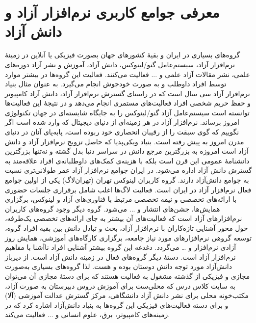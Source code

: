 \documentclass{article}
\begin{document}
\section{معرفی جوامع کاربری نرم‌افزار آزاد و دانش آزاد}
گروه‌های بسیاری در ایران و بقیهٔ کشورهای جهان بصورت فیزیکی یا آنلاین در زمینهٔ نرم‌افزار آزاد، سیستم‌عامل‌ گنو/لینوکس، دانش آزاد، آموزش و نشر آزاد دوره‌های علمی، نشر مقالات آزاد علمی و ... فعالیت می‌کنند. فعالیت این گروه‌ها در بیشتر موارد توسط افراد داوطلب و به صورت خودجوش انجام می‌گیرد.
به عنوان مثال بنیاد نرم‌افزار آزاد سی سال است که در راستای گسترش نرم‌افزار آزاد، دانش آزاد کامپیوتر و حفظ حریم شخصی افراد فعالیت‌های مستمری انجام می‌دهد و در نتیجهٔ این فعالیت‌ها توانسته است سیستم‌عامل آزاد گنو/لینوکس را به جایگاه شایسته‌ای در جهان تکنولوژی امروز برساند. نرم‌افزار آزاد در هر زمینه‌ای از دنیای دیجیتال که وارد شده است اگر نگوییم که گوی سبقت را از رقیبان انحصاری خود ربوده است، پابه‌پای آنان در دنیای مدرن امروز به پیش رفته است.
بنیاد ویکی‌پدیا که حاصل تزویج نرم‌افزار آزاد و دانش آزاد است امروزه به بزرگترین مرجع دانش در سراسر دنیا بدل گشته و نه‌تنها بزرگترین دانشنامهٔ عمومی این قرن است بلکه با هزینه‌ی کمک‌های داوطلبانه‌ی افراد علاقه‌مند به گسترش دانش آزاد اداره می‌شود.
در ایران جوامع نرم‌افزار آزاد عمر طولانی‌تری نسبت به جوامع دانش‌آزاد دارند. گروه کاربران لینوکس تهران (تهران‌لاگ) یکی از اولین جوامع فعال نرم‌افزار آزاد در ایران است. فعالیت لاگ‌ها اغلب شامل برقراری جلسات حضوری با ارائه‌های تخصصی و نیمه تخصصی مرتبط با فناوری‌های آزاد و لینوکس، برگزاری همایش‌ها، جشن‌های انتشار و ... می‌شود.
گروه دیگر وجود گروه‌های کاربران نرم‌افزار‌های آزاد است که فعالیت‌های آن بیشتر به جای ارائه‌های تخصصی یک‌طرفه، حول محور آشنایی تازه‌کاران با نرم‌افزار آزاد، بحث و تبادل دانش بین بقیه افراد گروه، توسعه گروهی نرم‌افزار‌های مورد نیاز جامعه، برگزاری کارگاه‌های آموزشی، همایش‌ روز آزادی نرم‌افزار و … می‌گردد. دغدغه این گروه بیشتر آشنایی افراد ناآشنا با مفاهیم نرم‌افزار آزاد است.
دستهٔ دیگر گروه‌های فعال در زمینه دانش آزاد است. از دیرباز دانش‌آزاد مورد توجه دانش دوستان بوده و هست. لذا گروه‌های بسیاری به‌صورت مجازی و فیزیکی از گذشته مشغول به فعالیت هستند که برای دستهٔ مجازی آن می‌توان به سایت کلاس درس
 که محلی‌ست برای آموزش دروس دبیرستان به صورت آزاد، مکتب‌خونه محلی برای نشر دانش آزاد دانشگاهی،‌ مرکز گسترش عدالت آموزشی (آلا) و برای دسته فعالیت‌های فیزیکی این گروه‌ها به بنیاد دانش‌آزاد اشاره کرد که در زمینه‌های کامپیوتر، برق، علوم انسانی و ... فعالیت می‌کند.
\end{document}
